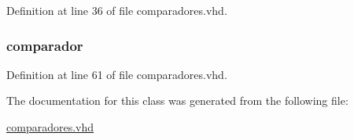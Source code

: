 Definition at line 36 of file comparadores.\+vhd.

\hypertarget{classcomparadores_1_1comparadores_a6277e2a7446059985dc9bcf0a4ac1a8f}{}
\subsubsection[{u}]{ {\bfseries \textcolor{vhdlchar}{comparador}\textcolor{vhdlchar}{ }} \hspace{0.3cm}{\ttfamily [Instantiation]}}\label{classcomparadores_1_1comparadores_a6277e2a7446059985dc9bcf0a4ac1a8f}


Definition at line 61 of file comparadores.\+vhd.



The documentation for this class was generated from the following file\+:\begin{DoxyCompactItemize}
\item 
\hyperlink{comparadores_8vhd}{comparadores.\+vhd}\end{DoxyCompactItemize}
